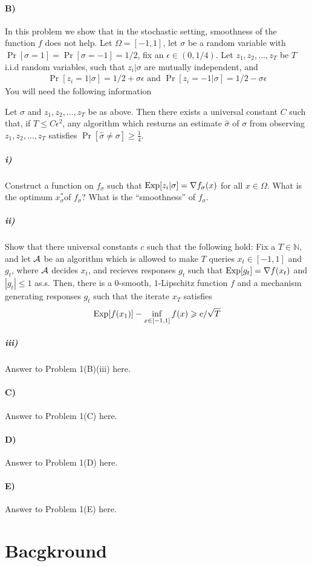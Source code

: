 \documentclass[12pt]{article}
\begin{document}
\paragraph{B)}In this problem we show that in the stochastic setting, smoothness of the function $f$ does not help. Let $\Omega = [-1,1]$, let $\sigma$ be a random variable with $\Pr[\sigma = 1] = \Pr[\sigma = -1] = 1/2$, fix an $\epsilon \in (0,1/4)$. Let $z_1,z_2,\dots,z_T$ be $T$ i.i.d random variables, such that $z_i | \sigma$ are mutually independent, and 
\begin{eqnarray}
\Pr[z_i =  1 | \sigma] = 1/2 + \sigma \epsilon \text{ and } \Pr[z_i =  -1 | \sigma] = 1/2 - \sigma \epsilon 
\end{eqnarray}
You will need the following information
\begin{lemma*} Let $\sigma$ and $z_1,z_2,\dots,z_T$ be as above. Then there exists a universal constant $C$ such that, if $T \le C \epsilon^2$, any algorithm which resturns an estimate $\widehat{\sigma}$ of $\sigma$ from observing $z_1,z_2,\dots,z_T$ satisfies $\Pr[\widehat{\sigma} \ne \sigma] \ge \frac{1}{4}$. 
\end{lemma*}
\subparagraph{i)} Construct a function on $f_{\sigma}$ such that $\mathrm{Exp}[z_i | \sigma] = \nabla f_{\sigma}(x)$ for all $x \in \Omega$. What is the optimum $x^*_{\sigma} $of $f_{\sigma}$? What is the ``smoothness'' of $f_{\sigma}$.
\subparagraph{ii)} Show that there universal constants $c$ such that the following hold: Fix a $T \in \mathbb{N}$, and let ${\cal A}$ be an algorithm which is allowed to make $T$ queries $x_t \in [-1,1]$ and $g_t$, where ${\cal A}$ decides $x_t$, and recieves responses $g_t$ such that $\mathrm{Exp}[g_t] = \nabla f(x_t)$ and $|g_t| \le 1$ as.s. Then, there is a $0$-smooth, $1$-Lipschitz function $f$ and a mechanism generating responses $g_t$ such that the iterate $x_{T}$ satisfies
\begin{eqnarray}
\mathrm{Exp}[f(x_{1})] - \inf_{x \in [-1,1]} f(x)\geqslant c /\sqrt{T}
\end{eqnarray}



\subparagraph{iii)} Answer to Problem 1(B)(iii) here.

\paragraph{C)} Answer to Problem 1(C) here.

\paragraph{D)} Answer to Problem 1(D) here.

\paragraph{E)} Answer to Problem 1(E) here.



\section*{Bacgkround}
\end{document}
